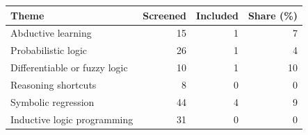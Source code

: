 \begin{tabular}{@{}lrrr@{}}
\toprule
Theme & Screened & Included & Share (\%) \\
\midrule
Abductive learning & 15 & 1 & 7 \\
Probabilistic logic & 26 & 1 & 4 \\
Differentiable or fuzzy logic & 10 & 1 & 10 \\
Reasoning shortcuts & 8 & 0 & 0 \\
Symbolic regression & 44 & 4 & 9 \\
Inductive logic programming & 31 & 0 & 0 \\
\bottomrule
\end{tabular}
